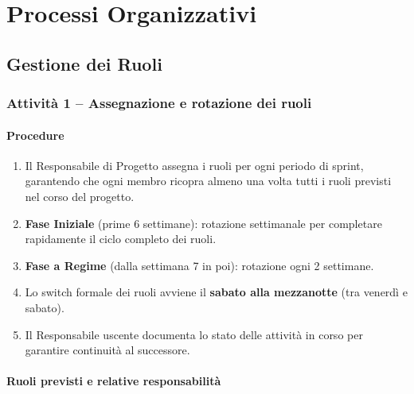 \documentclass[a4paper, 11pt, oneside]{scrartcl}
\begin{document}
\newpage
\section{Processi Organizzativi}
\label{sec:processi_organizzativi}

\subsection{Gestione dei Ruoli}

\subsubsection{Attività 1 – Assegnazione e rotazione dei ruoli}

\paragraph{Procedure}
\begin{enumerate}
    \item Il Responsabile di Progetto assegna i ruoli per ogni periodo di sprint, garantendo che ogni membro ricopra almeno una volta tutti i ruoli previsti nel corso del progetto.
    \item \textbf{Fase Iniziale} (prime 6 settimane): rotazione settimanale per completare rapidamente il ciclo completo dei ruoli.
    \item \textbf{Fase a Regime} (dalla settimana 7 in poi): rotazione ogni 2 settimane.
    \item Lo switch formale dei ruoli avviene il \textbf{sabato alla mezzanotte} (tra venerdì e sabato).
    \item Il Responsabile uscente documenta lo stato delle attività in corso per garantire continuità al successore.
\end{enumerate}

\paragraph{Ruoli previsti e relative responsabilità}
\end{document}
